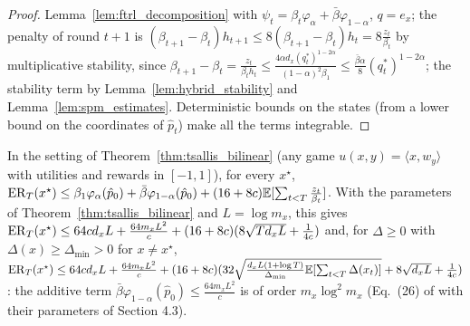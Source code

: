 \begin{proof}
  \leanok
  Lemma~\ref{lem:ftrl_decomposition} with $\psi_t = \beta_t\varphi_\alpha + \bar\beta
  \varphi_{1-\alpha}$, $q = e_x$; the penalty of round $t + 1$ is $(\beta_{t+1} - \beta_t)h_{t+1} \le
  8(\beta_{t+1} - \beta_t)h_t = 8\frac{z_t}{\beta_t}$ by multiplicative stability, since
  $\beta_{t+1} - \beta_t = \frac{z_t}{\beta_t h_t} \le \frac{4\alpha d_x (q^*_t)^{1 - 2\alpha}}{(1 -
  \alpha)^2\beta_1} \le \frac{\bar\beta\alpha}{8}(q^*_t)^{1 - 2\alpha}$; the stability term by
  Lemma~\ref{lem:hybrid_stability} and Lemma~\ref{lem:spm_estimates}. Deterministic bounds on the
  states (from a lower bound on the coordinates of $\hat p_t$) make all the terms integrable.
\end{proof}

\begin{lemma}
  \label{lem:tsallis_spm_regret}
  \leanok
  In the setting of Theorem~\ref{thm:tsallis_bilinear} (any game $u(x, y) = \langle x,
  w_y\rangle$ with utilities and rewards in $[-1, 1]$), for every $x^\star$,
  $\mathrm{ER}_T(x^\star) \le \beta_1\varphi_\alpha(\hat p_0) + \bar\beta\varphi_{1-\alpha}(\hat p_0) + (16 +
  8c)\mathbb{E}[\sum_{t < T}\frac{z_t}{\beta_t}]$. With the parameters of Theorem~\ref{thm:tsallis_bilinear}
  and $L = \log m_x$, this gives $\mathrm{ER}_T(x^\star) \le 64 c d_x L + \frac{64 m_x L^2}{c} + (16 +
  8c)(8\sqrt{T d_x L} + \frac{1}{4c})$ and, for $\Delta \ge 0$ with $\Delta(x) \ge \Delta_{\min} >
  0$ for $x \ne x^\star$, $\mathrm{ER}_T(x^\star) \le 64 c d_x L + \frac{64 m_x L^2}{c} + (16 + 8c)(32
  \sqrt{\frac{d_x L (1 + \log T)}{\Delta_{\min}}\mathbb{E}[\sum_{t < T}\Delta(x_t)]} + 8\sqrt{d_x L} +
  \frac{1}{4c})$: the additive term $\bar\beta\varphi_{1-\alpha}(\hat p_0) \le \frac{64 m_x
  L^2}{c}$ is of order $m_x\log^2 m_x$ (Eq.~(26) of \cite{ito2024adaptive} with their parameters of
  Section 4.3).
\end{lemma}

